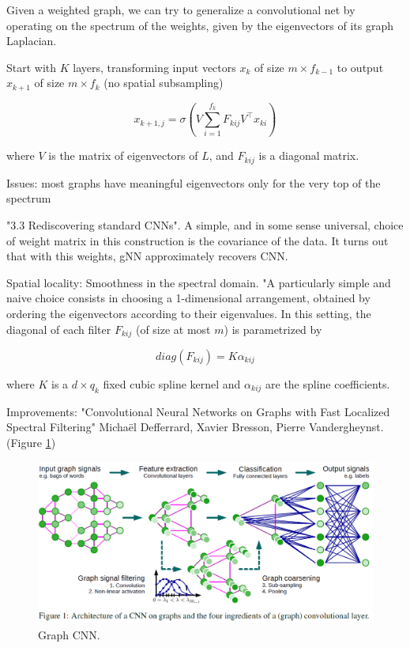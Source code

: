\documentclass[english]{article}
\begin{document}
Given a weighted graph, we can try to
generalize a convolutional net by operating on the spectrum of the weights, given by the eigenvectors of its graph Laplacian.


\bitem 

\item Start with $K$ layers, transforming input vectors $x_k$ of size $m\times f_{k-1}$ to output $x_{k+1}$ of size $m\times f_{k}$ (no spatial subsampling)

$$
x_{k+1,j}
= \sigma 
(
V \sum_{i=1}^{f_k} F_{kij} V^\top x_{ki}
)
$$

where $V$ is the matrix of eigenvectors of $L$, and $F_{kij}$ is a diagonal matrix. 

\item Issues:  most graphs have meaningful eigenvectors only for
the very top of the spectrum
\eitem 

\item "3.3 Rediscovering standard CNNs". A simple, and in some sense universal, choice of weight matrix in this construction is the covariance
of the data. It turns out that with this weights, gNN approximately recovers CNN.


\item Spatial locality: Smoothness in the spectral domain. "A particularly simple and naive choice consists in choosing a 1-dimensional arrangement, obtained
by ordering the eigenvectors according to their eigenvalues.  In this setting, the diagonal of each filter
$F_{kij}$ (of size at most $m$) is parametrized by

$$diag(F_{kij}) = K\alpha_{kij}$$

where $K$ is a $d \times q_k$ fixed cubic spline kernel and $\alpha_{kij}$ are the spline coefficients.




\eitem 

\item Improvements: "Convolutional Neural Networks on Graphs
with Fast Localized Spectral Filtering" Michaël Defferrard, Xavier Bresson, Pierre Vandergheynst. (Figure \ref{gcnn})


\begin{figure}
  \centering
  \includegraphics[scale=0.5]{gcnn.png}
    \caption{Graph CNN.}
    \label{gcnn}
\end{figure}
\end{document}
